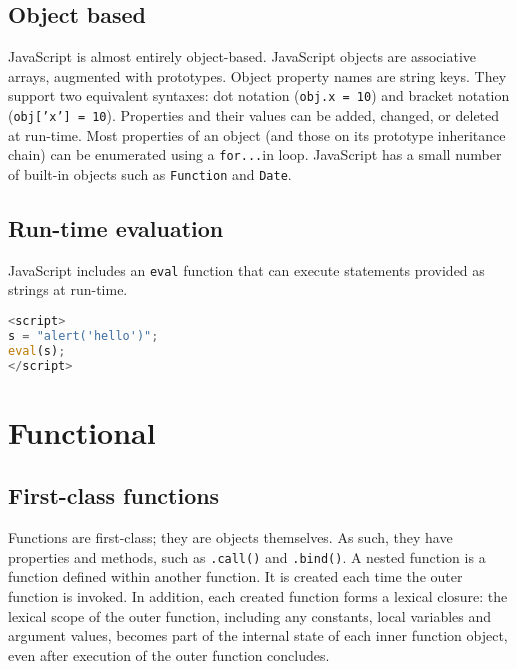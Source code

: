 \subsection{Object based}

JavaScript is almost entirely object-based. JavaScript objects are associative arrays, augmented with prototypes. Object property names are string keys. They support two equivalent syntaxes: dot notation (\texttt{obj.x = 10}) and bracket notation (\texttt{obj['x'] = 10}). Properties and their values can be added, changed, or deleted at run-time. Most properties of an object (and those on its prototype inheritance chain) can be enumerated using a \texttt{for...}in loop. JavaScript has a small number of built-in objects such as \texttt{Function} and \texttt{Date}.



\subsection{Run-time evaluation}


JavaScript includes an \texttt{eval} function that can execute statements provided as strings at run-time.

\begin{lstlisting}[language=JavaScript]
<script>
s = "alert('hello')";
eval(s);
</script>
\end{lstlisting}


\section{Functional}


\subsection{First-class functions}

Functions are first-class; they are objects themselves. As such, they have properties and methods, such as \texttt{.call()} and \texttt{.bind()}. A nested function is a function defined within another function. It is created each time the outer function is invoked. In addition, each created function forms a lexical closure: the lexical scope of the outer function, including any constants, local variables and argument values, becomes part of the internal state of each inner function object, even after execution of the outer function concludes.







